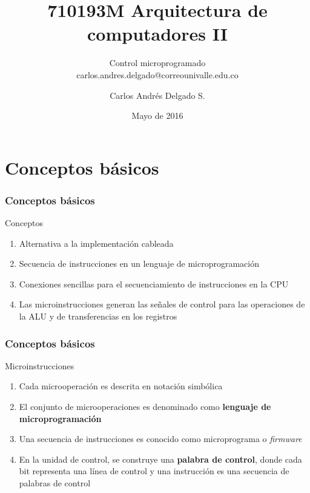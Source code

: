 \documentclass{beamer}
\author{Carlos Andr\'es Delgado S.}
\title{710193M Arquitectura de computadores II}
\subtitle{Control microprogramado \\ carlos.andres.delgado@correounivalle.edu.co}
\institute{Facultad de Ingeniería. Universidad del Valle}
\date{Mayo de 2016}
\begin{document}
\begin{frame}
	\titlepage	 		
\end{frame}

\begin{frame}
	\tableofcontents	 		
\end{frame}


\section{Conceptos básicos}

\begin{frame}
	\frametitle{Conceptos básicos}
	\begin{block}{Conceptos}
	\begin{enumerate}
		\item Alternativa a la implementación cableada
		\item Secuencia de instrucciones en un lenguaje de microprogramación
		\item Conexiones sencillas para el secuenciamiento de instrucciones en la CPU
		\item Las microinstrucciones generan las señales de control para las operaciones de la ALU y de transferencias en los registros
	\end{enumerate}
	\end{block}	
\end{frame}


\begin{frame}
	\frametitle{Conceptos básicos}
	\begin{block}{Microinstrucciones}
	\begin{enumerate}
		\item Cada microoperación es descrita en notación simbólica
		\item El conjunto de microoperaciones es denominado como \textbf{lenguaje de microprogramación}
		\item Una secuencia de instrucciones es conocido como microprograma o \textit{firmware}
		\item En la unidad de control, se construye una \textbf{palabra de control}, donde cada bit representa una línea de control y una instrucción es una secuencia de palabras de control
	\end{enumerate}
	\end{block}	
\end{frame}
\end{document}
